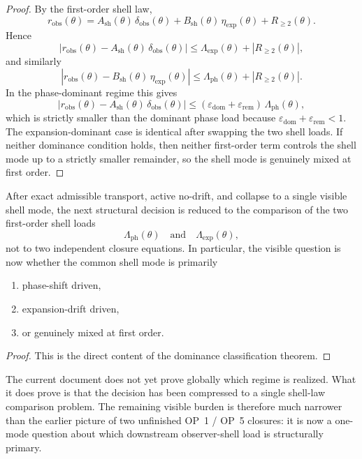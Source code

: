 \begin{proof}
By the first-order shell law,
\[
  r_{\mathrm{obs}}(\theta)
  =A_{\mathrm{sh}}(\theta)\,\delta_{\mathrm{obs}}(\theta)
  +B_{\mathrm{sh}}(\theta)\,\eta_{\mathrm{exp}}(\theta)
  +R_{\ge 2}(\theta).
\]
Hence
\[
  |r_{\mathrm{obs}}(\theta)-A_{\mathrm{sh}}(\theta)\,\delta_{\mathrm{obs}}(\theta)|
  \le \Lambda_{\mathrm{exp}}(\theta)+|R_{\ge 2}(\theta)|,
\]
and similarly
\[
  |r_{\mathrm{obs}}(\theta)-B_{\mathrm{sh}}(\theta)\,\eta_{\mathrm{exp}}(\theta)|
  \le \Lambda_{\mathrm{ph}}(\theta)+|R_{\ge 2}(\theta)|.
\]
In the phase-dominant regime this gives
\[
  |r_{\mathrm{obs}}(\theta)-A_{\mathrm{sh}}(\theta)\,\delta_{\mathrm{obs}}(\theta)|
  \le (\varepsilon_{\mathrm{dom}}+\varepsilon_{\mathrm{rem}})\,\Lambda_{\mathrm{ph}}(\theta),
\]
which is strictly smaller than the dominant phase load because $\varepsilon_{\mathrm{dom}}+\varepsilon_{\mathrm{rem}}<1$. The expansion-dominant case is identical after swapping the two shell loads. If neither dominance condition holds, then neither first-order term controls the shell mode up to a strictly smaller remainder, so the shell mode is genuinely mixed at first order.
\end{proof}

\begin{corollary}
After exact admissible transport, active no-drift, and collapse to a single visible shell mode, the next structural decision is reduced to the comparison of the two first-order shell loads
\[
  \Lambda_{\mathrm{ph}}(\theta)
  \quad\text{and}\quad
  \Lambda_{\mathrm{exp}}(\theta),
\]
not to two independent closure equations. In particular, the visible question is now whether the common shell mode is primarily
\begin{enumerate}[leftmargin=2em,label=(\roman*)]
\item phase-shift driven,
\item expansion-drift driven,
\item or genuinely mixed at first order.
\end{enumerate}
\end{corollary}

\begin{proof}
This is the direct content of the dominance classification theorem.
\end{proof}

\begin{remark}
The current document does not yet prove globally which regime is realized. What it does prove is that the decision has been compressed to a single shell-law comparison problem. The remaining visible burden is therefore much narrower than the earlier picture of two unfinished OP~1 / OP~5 closures: it is now a one-mode question about which downstream observer-shell load is structurally primary.
\end{remark}



